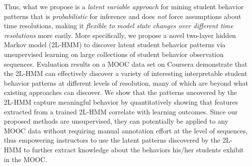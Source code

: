 Thus, what we propose is a \emph{latent variable approach} for mining student behavior
patterns that is \emph{probabilistic} for inference and
does \emph{not} force assumptions about time resolutions, making it
\emph{flexible to model state changes over different time resolutions} more
easily.  More specifically, we propose a novel two-layer hidden Markov
model (2L-HMM) to discover latent student behavior patterns via
unsupervised learning on large collections of student behavior observation
sequences.  Evaluation results on a MOOC data set on Coursera demonstrate
that the 2L-HMM can effectively discover a variety of interesting interpretable
student behavior patterns at different levels of resolution, many of which
are beyond what existing approaches can discover. We show that the patterns
uncovered by the 2L-HMM capture meaningful behavior by quantitatively
showing that features extracted from a trained 2L-HMM correlate with
learning outcomes. Since our proposed methods are
unsupervised, they can potentially be applied to any MOOC data without
requiring manual annotation effort at the level of sequences, thus empowering
instructors 
to use the latent patterns discovered by the 2L-HMM to further extract knowledge about the behaviors his/her
students exhibit in the MOOC.
